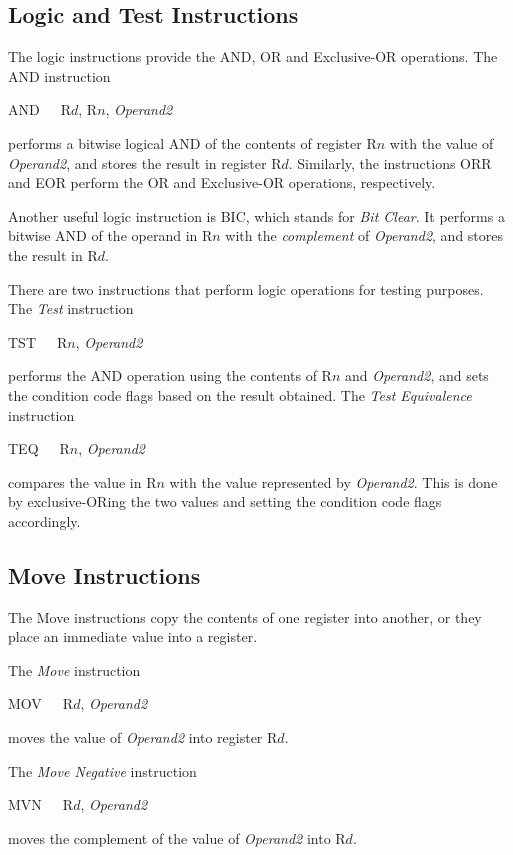 \documentclass[11pt, twoside, pdftex]{article}
\begin{document}
\subsection{Logic and Test Instructions}
\label{sec:logic}

The logic instructions provide the AND, OR and Exclusive-OR
operations.  The AND instruction
\begin{center}
		  AND~~~R$d$, R$n$, {\it Operand2}
\end{center}
\noindent
performs a bitwise logical AND of the contents of register R$n$ with the value of 
{\it Operand2}, and stores the result in register R$d$. Similarly, the instructions ORR 
and EOR perform the OR and Exclusive-OR operations, respectively.

Another useful logic instruction is BIC, which stands for {\it Bit Clear}. It
performs a bitwise AND of the operand in R$n$ with the {\it complement} of {\it Operand2}, 
and stores the result in R$d$.

There are two instructions that perform logic operations for 
testing purposes. The {\it Test} instruction
\begin{center}
		  TST~~~R$n$, {\it Operand2}
\end{center}
\noindent 
performs the AND operation using the contents of R$n$ and
{\it Operand2}, and sets the condition code flags
based on the result obtained. The {\it Test Equivalence} instruction
\begin{center}
		  TEQ~~~R$n$, {\it Operand2}
\end{center}
\noindent
compares the value in R$n$ with the value represented by {\it Operand2}.
This is done by exclusive-ORing the two values
and setting the condition code flags accordingly.

\subsection{Move Instructions}
\label{sec:move}

The Move instructions copy the contents of one register into another, or they place 
an immediate value into a register.

The {\it Move} instruction
\begin{center}
		  MOV~~~R$d$, {\it Operand2}
\end{center}
\noindent 
moves the value of {\it Operand2} into register R$d$. 

The {\it Move Negative} instruction
\begin{center}
		  MVN~~~R$d$, {\it Operand2}
\end{center}
\noindent
moves the complement of the value of {\it Operand2} into R$d$.
\end{document}
